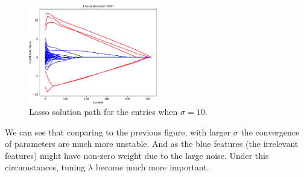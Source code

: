 \documentclass{article}
\begin{document}
\clearpage
\begin{figure}[htbp]
    \begin{center}
        \includegraphics[width=0.5\textwidth]{./figures/lasso_solution_path_large_v.pdf}
    \end{center}
    \caption{Lasso solution path for the entries when $ \sigma = 10 $.}\label{fig:}
\end{figure}
We can see that conparing to the previous figure, with larger $ \sigma $ the convergence of parameters are much more unstable. And as the blue features (the irrelevant features) might have non-zero weight due to the large noise. Under this circumstances, tuning $ \lambda $ become much more important.
\clearpage
\end{document}
